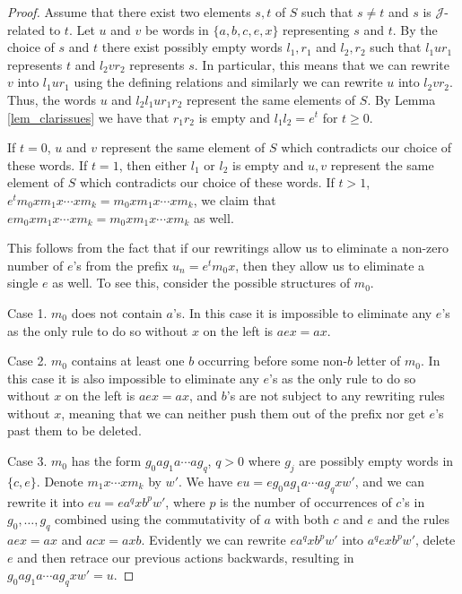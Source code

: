 \documentclass{article}
\theoremstyle{definition}
\def\J{\mathcal J}
\begin{document}
\begin{proof}
Assume that there exist two elements $s,t$ of $S$ such that $s \neq t$ and $s$ is $\J$-related to $t$. Let $u$ and $v$ be words in $\{a,b,c,e,x \}$ representing $s$ and $t$. By the choice of $s$ and $t$ there exist possibly empty words $l_1, r_1$ and $l_2, r_2$ such that $l_1 u r_1$ represents $t$ and $l_2 v r_2$ represents $s$. In particular, this means that we can rewrite $v$ into $l_1 u r_1$ using the defining relations and similarly we can rewrite $u$ into $l_2 v r_2$. Thus, the words $u$ and $l_2 l_1 u r_1 r_2$  represent the same elements of $S$. By Lemma \ref{lem_clarissues} we have that $r_1 r_2$ is empty and $l_1 l_2 = e^t$ for $t \ge 0$.

If $t=0$, $u$ and $v$ represent the same element of $S$ which contradicts our choice of these words. If $t = 1$, then either $l_1$ or $l_2$ is empty and $u,v$ represent the same element of $S$ which contradicts our choice of these words. If $t > 1$, $e^t m_0 x m_1 x \cdots x m_k = m_0 x m_1 x \cdots x m_k$, we claim that $e m_0 x m_1 x \cdots x m_k = m_0 x m_1 x \cdots x m_k$ as well.

This follows from the fact that if our rewritings allow us to eliminate a non-zero number of $e$'s from the prefix $u_n = e^t m_0 x$, then they allow us to eliminate a single $e$ as well. To see this, consider the possible structures of $m_0$.

Case 1. $m_0$ does not contain $a$'s. In this case it is impossible to eliminate any $e$'s as the only rule to do so without $x$ on the left is $aex = ax$.

Case 2. $m_0$ contains at least one $b$ occurring before some non-$b$ letter of $m_0$.  In this case it is also impossible to eliminate any $e$'s as the only rule to do so without $x$ on the left is $aex = ax$, and $b$'s are not subject to any rewriting rules without $x$, meaning that we can neither push them out of the prefix nor get $e$'s past them to be deleted.

Case 3. $m_0$ has the form $g_0 a g_1 a \cdots a g_q$, $q>0$ where $g_j$ are possibly empty words in $\{c,e\}$. Denote $m_1 x \cdots x m_k$ by $w'$. We have $e u = e g_0 a g_1 a \cdots a g_q x w'$, and we can rewrite it into $e u = e a^{q} x b^p w'$, where $p$ is the number of occurrences of $c$'s in $g_0,\ldots, g_q$ combined using the commutativity of $a$ with both $c$ and $e$ and the rules $aex = ax$ and $acx = axb$. Evidently we can rewrite $e a^{q} x b^p w'$ into $a^{q} e x b^p w'$, delete $e$ and then retrace our previous actions backwards, resulting in $ g_0 a g_1 a \cdots a g_q x w' = u$.


\end{proof}
\end{document}
